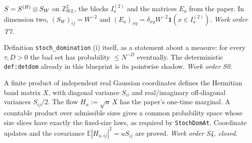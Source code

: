 \begin{definition}
  \label{def:block-model}
  \leanok
  $S=S^{(B)}\otimes S_W$ on $\mathbb Z_{WL}^2$, the blocks $I^{(2)}_a$ and the matrices
  $E_a$ from the paper.  In dimension two, $(S_W)_{ij}=W^{-2}$ and
  $(E_a)_{xy}=\delta_{xy}W^{-2}\mathbf 1(x\in I_a^{(2)})$.
  \emph{Work order T7.}
\end{definition}

\begin{definition}\label{def:stochdom}
  \leanok
  Definition \texttt{stoch\_domination} (i) itself, as a statement about a
  measure: for every $\tau,D>0$ the bad set has probability $\le N^{-D}$
  eventually.  The deterministic \texttt{def:detdom} already in this blueprint is
  its pointwise shadow.  \emph{Work order S0.}
\end{definition}

\begin{definition}\label{def:model}
  \leanok
  A finite product of independent real Gaussian coordinates defines the
  Hermitian band matrix $X$, with diagonal variance $S_{ii}$ and real/imaginary
  off-diagonal variances $S_{ij}/2$.  The flow $H_u:=\sqrt u\,X$ has the
  paper's one-time marginal.  A countable product over admissible sizes gives
  a common probability space whose size slices have exactly the fixed-size
  laws, as required by \texttt{StochDomAt}.  Coordinate updates and the
  covariance $\mathbb E|H_{u,ij}|^2=uS_{ij}$ are proved.
  \emph{Work order S4, closed.}
\end{definition}

